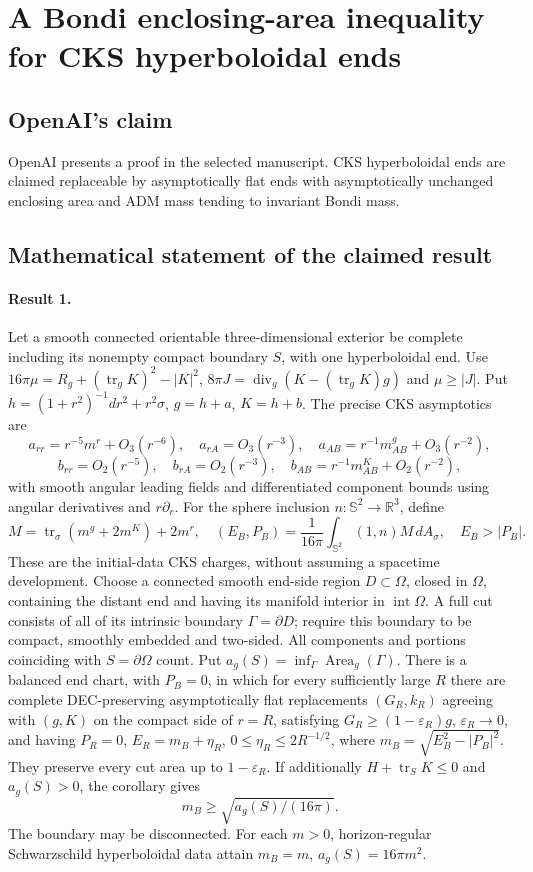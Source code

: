 \documentclass[11pt]{article}
\begin{document}
\section*{A Bondi enclosing-area inequality for CKS hyperboloidal ends}

\subsection{OpenAI's claim}
OpenAI presents a proof in the selected manuscript. CKS hyperboloidal ends are claimed replaceable by asymptotically flat ends with asymptotically unchanged enclosing area and ADM mass tending to invariant Bondi mass.

\subsection{Mathematical statement of the claimed result}
\paragraph{Result 1.} Let a smooth connected orientable three-dimensional exterior be complete including its nonempty compact boundary $S$, with one hyperboloidal end. Use $16\pi\mu=R_g+(\operatorname{tr}_gK)^2-|K|^2$, $8\pi J=\operatorname{div}_g(K-(\operatorname{tr}_gK)g)$ and $\mu\ge|J|$. Put $h=(1+r^2)^{-1}dr^2+r^2\sigma$, $g=h+a$, $K=h+b$. The precise CKS asymptotics are
\[
 a_{rr}=r^{-5}m^r+O_3(r^{-6}),\quad a_{rA}=O_3(r^{-3}),\quad
 a_{AB}=r^{-1}m^g_{AB}+O_3(r^{-2}),
\]
\[
 b_{rr}=O_2(r^{-5}),\quad b_{rA}=O_2(r^{-3}),\quad
 b_{AB}=r^{-1}m^K_{AB}+O_2(r^{-2}),
\]
with smooth angular leading fields and differentiated component bounds using angular derivatives and $r\partial_r$. For the sphere inclusion $n:\mathbb S^2\to\mathbb R^3$, define
\[
 M=\operatorname{tr}_\sigma(m^g+2m^K)+2m^r,\quad
 (E_B,P_B)=\frac1{16\pi}\int_{\mathbb S^2}(1,n)M\,dA_\sigma,\quad E_B>|P_B|.
\]
These are the initial-data CKS charges, without assuming a spacetime development. Choose a connected smooth end-side region $D\subset\Omega$, closed in $\Omega$, containing the distant end and having its manifold interior in $\operatorname{int}\Omega$. A full cut consists of all of its intrinsic boundary $\Gamma=\partial D$; require this boundary to be compact, smoothly embedded and two-sided. All components and portions coinciding with $S=\partial\Omega$ count. Put $a_g(S)=\inf_\Gamma\operatorname{Area}_g(\Gamma)$. There is a balanced end chart, with $P_B=0$, in which for every sufficiently large $R$ there are complete DEC-preserving asymptotically flat replacements $(G_R,k_R)$ agreeing with $(g,K)$ on the compact side of $r=R$, satisfying $G_R\ge(1-\varepsilon_R)g$, $\varepsilon_R\to0$, and having $P_R=0$, $E_R=m_B+\eta_R$, $0\le\eta_R\le2R^{-1/2}$, where $m_B=\sqrt{E_B^2-|P_B|^2}$. They preserve every cut area up to $1-\varepsilon_R$. If additionally $H+\operatorname{tr}_SK\le0$ and $a_g(S)>0$, the corollary gives
\[
 m_B\ge\sqrt{a_g(S)/(16\pi)}.
\]
The boundary may be disconnected. For each $m>0$, horizon-regular Schwarzschild hyperboloidal data attain $m_B=m$, $a_g(S)=16\pi m^2$.
\end{document}
